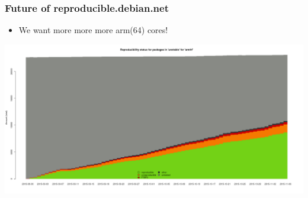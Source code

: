\documentclass[14pt]{beamer}
\begin{document}
\begin{frame}
 \frametitle{Future of reproducible.debian.net}

 \begin{itemize}
 \item We want more more more arm(64) cores!
 \end{itemize}
 \begin{center}
  \includegraphics[height=0.5\paperheight]{images/stats_pkg_state_armhf.png}
  \vfill
 \end{center}
\end{frame}
\end{document}
